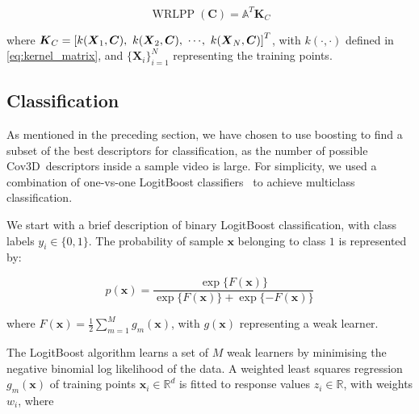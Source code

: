 \documentclass[10pt,twocolumn,letterpaper]{article}
\newcommand{\eqsize}{\footnotesize}
\newcommand{\cov}{{Cov3D}}
\newcommand{\vect}[1]{{\boldsymbol{#1}}}
\newcommand{\mat}[1]{{\boldsymbol{#1}}}
\begin{document}
\vspace{-1ex}
\eqsize
\begin{equation}
  \operatorname{WRLPP}(\mat{C}) = \mathbb{A}^T \mat{K}_C
  \label{eq:wrlpp}
\end{equation}
\normalsize


\noindent
where \mbox{\eqsize $\mat{K}_C = \left[ k(\mat{X}_1, \mat{C}),~ k(\mat{X}_2, \mat{C}),~ \cdots\hspace{-0.25ex},~ k(\mat{X}_N, \mat{C}) \right]^T$},
with {\eqsize $k(\cdot, \cdot)$} defined in \eqref{eq:kernel_matrix},
and {\eqsize $\{\mat{X}_i\}_{i=1}^{N}$} representing the training points.








\subsection{Classification}
\label{sec:classifier}

As mentioned in the preceding section,
we have chosen to use boosting to find a subset of the best descriptors for classification,
as the number of possible \cov~descriptors inside a sample video is large.
For simplicity, we used a combination of one-vs-one LogitBoost classifiers~\cite{FriedmanEtAl2000}
to achieve multiclass classification.

We start with a brief description of binary LogitBoost classification, with class labels {\eqsize $y_i \in \{0,1\}$}.
The probability of sample {\eqsize $\vect{x}$} belonging to class {\eqsize $1$} is represented by:

\vspace{-1ex}
\eqsize
\begin{equation}
  p(\vect{x})
  =
  \frac
  {\exp\{F(\vect{x})\} }
  { \exp\{F(\vect{x})\} + \exp\{-F(\vect{x})\}}
\end{equation}
\normalsize

\noindent
where {\eqsize $F(\vect{x}) = \frac{1}{2} \sum\nolimits_{m=1}^M g_m(\vect{x})$},
with {\eqsize $g(\vect{x})$} representing a weak learner.

The LogitBoost algorithm learns a set of {\eqsize $M$} weak learners
by minimising the negative binomial log likelihood of the data.
A weighted least squares regression {\eqsize $g_m(\vect{x})$} of training points {\eqsize $\vect{x}_i \in
\mathbb{R}^d$} is fitted to response values {\eqsize $z_i \in \mathbb{R}$}, with weights {\eqsize $w_i$},
where
\end{document}
